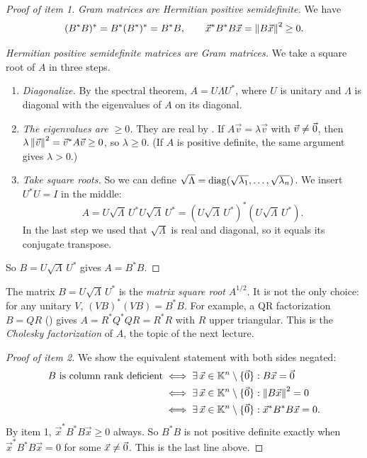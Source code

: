 \begin{proof}[Proof of item 1]
  \emph{Gram matrices are Hermitian positive semidefinite.} We have
  \begin{equation}
    (B^\ast B)^\ast = B^\ast(B^\ast)^\ast = B^\ast B, \qquad \vec{x}^\ast B^\ast B\vec{x} = \left\lVert B\vec{x} \right\rVert^2 \ge 0.
  \end{equation}

  \emph{Hermitian positive semidefinite matrices are Gram matrices.} We take a square root of $A$ in three steps.
  \begin{enumerate}
    \item \emph{Diagonalize.} By the spectral theorem, $A = U\Lambda U^\ast$, where $U$ is unitary and $\Lambda$ is diagonal with the eigenvalues of $A$ on its diagonal.
    \item \emph{The eigenvalues are $\ge 0$.} They are real by . If $A\vec{v} = \lambda\vec{v}$ with $\vec{v} \ne \vec{0}$, then $\lambda\left\lVert \vec{v} \right\rVert^2 = \vec{v}^\ast A\vec{v} \ge 0$, so $\lambda \ge 0$. (If $A$ is positive definite, the same argument gives $\lambda > 0$.)
    \item \emph{Take square roots.} So we can define $\sqrt{\Lambda} = \operatorname{diag}(\sqrt{\lambda_1}, \dots, \sqrt{\lambda_n})$. We insert $U^\ast U = I$ in the middle:
    \begin{equation}
      A = U\sqrt{\Lambda}\,U^\ast U\sqrt{\Lambda}\,U^\ast = \left(U\sqrt{\Lambda}\,U^\ast\right)^\ast\left(U\sqrt{\Lambda}\,U^\ast\right).
    \end{equation}
    In the last step we used that $\sqrt{\Lambda}$ is real and diagonal, so it equals its conjugate transpose.
  \end{enumerate}
  So $B = U\sqrt{\Lambda}\,U^\ast$ gives $A = B^\ast B$.
\end{proof}

The matrix $B = U\sqrt{\Lambda}\,U^\ast$ is the \emph{matrix square root} $A^{1/2}$. It is not the only choice: for any unitary $V$, $(VB)^\ast(VB) = B^\ast B$. For example, a QR factorization $B = QR$ () gives $A = R^\ast Q^\ast QR = R^\ast R$ with $R$ upper triangular. This is the \emph{Cholesky factorization} of $A$, the topic of the next lecture.

\begin{proof}[Proof of item 2]
  We show the equivalent statement with both sides negated:
  \begin{equation}
    \begin{aligned}
      B \text{ is column rank deficient}
      &\iff \exists\,\vec{x} \in \mathbb{K}^n \setminus \{\vec{0}\} : B\vec{x} = \vec{0} \\
      &\iff \exists\,\vec{x} \in \mathbb{K}^n \setminus \{\vec{0}\} : \left\lVert B\vec{x} \right\rVert^2 = 0 \\
      &\iff \exists\,\vec{x} \in \mathbb{K}^n \setminus \{\vec{0}\} : \vec{x}^\ast B^\ast B\vec{x} = 0.
    \end{aligned}
  \end{equation}
  By item 1, $\vec{x}^\ast B^\ast B\vec{x} \ge 0$ always. So $B^\ast B$ is not positive definite exactly when $\vec{x}^\ast B^\ast B\vec{x} = 0$ for some $\vec{x} \ne \vec{0}$. This is the last line above.
\end{proof}

